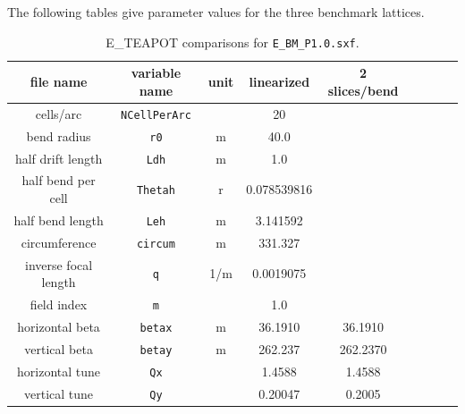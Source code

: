 \documentclass[]{article}
\begin{document}
The following tables give parameter values for the three benchmark lattices.
%
\begin{table}[h]
\caption{\label{tbl:benchmarkParams.P1.0}E\_TEAPOT comparisons for {\tt E\_BM\_P1.0.sxf}.
} 
\medskip
\centering
\begin{tabular}{|c|c|c|c|c|c|c|c|c|}           \hline
file name         & variable name     & unit  &   linearized  & 2 slices/bend &       \\ \hline
cells/arc         & {\tt NCellPerArc} &       &        20     &  &        \\
bend radius       &  {\tt r0}         &  m    &       40.0    &  &        \\
half drift length &  {\tt Ldh}        &  m    &        1.0    &  &        \\
half bend per cell & {\tt Thetah}     &  r    &  0.078539816  &  &        \\
half bend length  & {\tt Leh}         &  m    &   3.141592    &  &        \\
circumference     & {\tt circum}      &  m    &    331.327    &  &        \\ 
inverse focal length &  {\tt q}       & 1/m   &     0.0019075 &  &        \\
field index       &  {\tt m}          &       &         1.0   &  &         \\ \hline
horizontal beta  & {\tt betax}       &  m    &     36.1910   &  36.1910 &         \\ \hline
vertical beta     & {\tt betay}       &  m    &     262.237   &  262.2370 &         \\ \hline
horizontal tune  &  {\tt Qx}         &       &      1.4588   &  1.4588 &         \\ \hline
vertical tune     &  {\tt Qy}         &       &     0.20047   &  0.2005 &         \\
\hline
\end{tabular}
\end{table}
%
\end{document}
